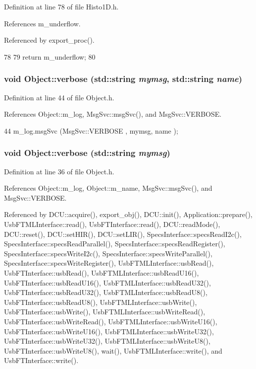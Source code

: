 Definition at line 78 of file Histo1D.h.

References m\_\-underflow.

Referenced by export\_\-proc().


\begin{DoxyCode}
78                     {
79     return m_underflow;
80   }  
\end{DoxyCode}
\hypertarget{classObject_a2d4120195317e2a3c6532e8bb9f3da68}{
\subsubsection[{verbose}]{\setlength{\rightskip}{0pt plus 5cm}void Object::verbose (std::string {\em mymsg}, \/  std::string {\em name})}}
\label{classObject_a2d4120195317e2a3c6532e8bb9f3da68}


Definition at line 44 of file Object.h.

References Object::m\_\-log, MsgSvc::msgSvc(), and MsgSvc::VERBOSE.


\begin{DoxyCode}
44 { m_log.msgSvc (MsgSvc::VERBOSE , mymsg, name ); }
\end{DoxyCode}
\hypertarget{classObject_a83d2db2df682907ea1115ad721c1c4a1}{
\subsubsection[{verbose}]{\setlength{\rightskip}{0pt plus 5cm}void Object::verbose (std::string {\em mymsg})}}
\label{classObject_a83d2db2df682907ea1115ad721c1c4a1}


Definition at line 36 of file Object.h.

References Object::m\_\-log, Object::m\_\-name, MsgSvc::msgSvc(), and MsgSvc::VERBOSE.

Referenced by DCU::acquire(), export\_\-obj(), DCU::init(), Application::prepare(), UsbFTMLInterface::read(), UsbFTInterface::read(), DCU::readMode(), DCU::reset(), DCU::setHIR(), DCU::setLIR(), SpecsInterface::specsReadI2c(), SpecsInterface::specsReadParallel(), SpecsInterface::specsReadRegister(), SpecsInterface::specsWriteI2c(), SpecsInterface::specsWriteParallel(), SpecsInterface::specsWriteRegister(), UsbFTMLInterface::usbRead(), UsbFTInterface::usbRead(), UsbFTMLInterface::usbReadU16(), UsbFTInterface::usbReadU16(), UsbFTMLInterface::usbReadU32(), UsbFTInterface::usbReadU32(), UsbFTMLInterface::usbReadU8(), UsbFTInterface::usbReadU8(), UsbFTMLInterface::usbWrite(), UsbFTInterface::usbWrite(), UsbFTMLInterface::usbWriteRead(), UsbFTInterface::usbWriteRead(), UsbFTMLInterface::usbWriteU16(), UsbFTInterface::usbWriteU16(), UsbFTMLInterface::usbWriteU32(), UsbFTInterface::usbWriteU32(), UsbFTMLInterface::usbWriteU8(), UsbFTInterface::usbWriteU8(), wait(), UsbFTMLInterface::write(), and UsbFTInterface::write().



